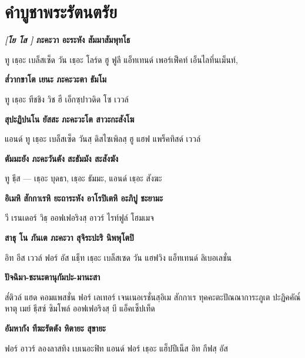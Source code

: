 \chapter{คําบูชาพระรัตนตรัย}

\textbf{\textit{[โย โส ]} ภะคะวา อะระหัง สัมมาสัมพุทโธ}

\begin{english}
ทู เธฺอะ เบล็สเซ็ด   วัน เธฺอะ โลร์ด ฮู ฟูลี แอ็ทเทนด์ เพอร์เฟ็คท์ เอ็นไลทึ่นเม็นท์,
\end{english}

\textbf{ส๎วากขาโต เยนะ ภะคะวะตา ธัมโม}

\begin{english}
ทู เธฺอะ ทีชชิง วิช ฮี เอ็กซฺปาวดิด โซ เววล์
\end{english}

\textbf{สุปะฏิปนโน  ยัสสะ ภะคะวะโต สาวะกะสังโฆ}

\begin{english}
แอนด์ ทู เธฺอะ เบล็สเซ็ด  วันสฺ ดิสไซเพิลสฺ ฮู แฮฟ แพร็คทิสด์ เววล์
\end{english}

\textbf{ตัมมะยัง ภะคะวันตัง สะธัมมัง สะสังฆัง}

\begin{english}
ทู ธีฺส — เธฺอะ บุดธา, เธฺอะ ธัมมะ, แอนด์ เธฺอะ สังฆะ
\end{english}

\textbf{อิเมหิ สักกาเรหิ ยะถาระหัง อาโรปิเตหิ อะภิปู ชะยามะ}

\begin{english}
วี เรนเดอร์ วิธฺ ออฟเฟอริงสฺ อาวร์ ไรท์ฟูล์ โฮมเมจ
\end{english}

\textbf{สาธุ โน ภันเต ภะคะวา สุจิระปะริ นิพพุโตปิ}

\begin{english}
อิท อีส เววล์ ฟอร์ อัส แธฺ็ท เธฺอะ เบล็สเซด วัน แฮฟวิง แอ็ทเทนด์ ลิเบอเลชั่น
\end{english}

\textbf{ปัจฉิมา-ชะนะตานุกัมปะ-มานะสา}

\begin{english}
ส๎ติวล์ แฮด คอมแพสชั่น ฟอร์ เลเทอร์ เจนเนอเรชั่นสฺอิเม สักกาเร ทุคคะตะปัณณาการะภูเต ปะฏิคคัณ๎หาตุ
เมย์ ธีฺสซ์ ซิมโพล์ ออฟเฟอริงสฺ บี แอ็คเซ็ปเท็ด
\end{english}

\textbf{อัมหากัง ทีฆะรัตตัง หิตายะ สุขายะ}

\begin{english}
	ฟอร์ อาวร์ ลองลาสทิง เบเนอะฟิท แอนด์ ฟอร์ เธฺอะ
	แฮ็ปปีเน็ส อิท กีฟสฺ อัส
\end{english}

